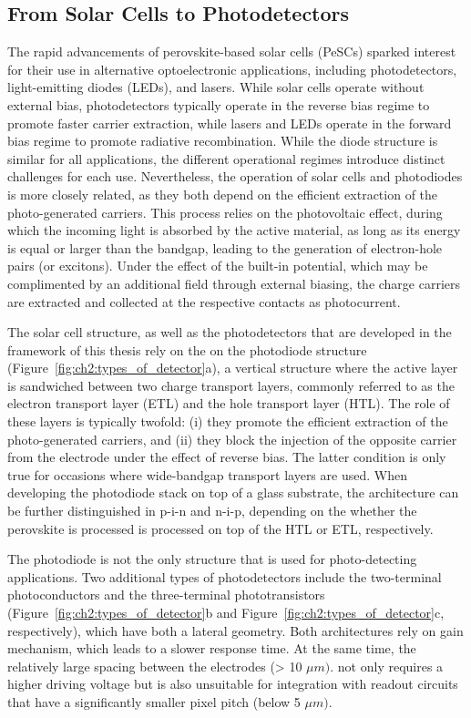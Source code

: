 \subsection{From Solar Cells to Photodetectors}

The rapid advancements of perovskite-based solar cells (PeSCs) sparked interest for their use in alternative optoelectronic applications, including photodetectors, light-emitting diodes (LEDs), and lasers. While solar cells operate without external bias, photodetectors typically operate in the reverse bias regime to promote faster carrier extraction, while lasers and LEDs operate in the forward bias regime to promote radiative recombination. While the diode structure is similar for all applications, the different operational regimes introduce distinct challenges for each use. Nevertheless, the operation of solar cells and photodiodes is more closely related, as they both depend on the efficient extraction of the photo-generated carriers. This process relies on the photovoltaic effect, during which the incoming light is absorbed by the active material, as long as its energy is equal or larger than the bandgap, leading to the generation of electron-hole pairs (or excitons). Under the effect of the built-in potential, which may be complimented by an additional field through external biasing, the charge carriers are extracted and collected at the respective contacts as photocurrent. 

The solar cell structure, as well as the photodetectors that are developed in the framework of this thesis rely on the on the photodiode structure (Figure~\ref{fig:ch2:types_of_detector}a), a vertical structure where the active layer is sandwiched between two charge transport layers, commonly referred to as the electron transport layer (ETL) and the hole transport layer (HTL). The role of these layers is typically twofold: (i) they promote the efficient extraction of the photo-generated carriers, and (ii) they block the injection of the opposite carrier from the electrode under the effect of reverse bias. The latter condition is only true for occasions where wide-bandgap transport layers are used. When developing the photodiode stack on top of a glass substrate, the architecture can be further distinguished in p-i-n and n-i-p, depending on the whether the perovskite is processed is processed on top of the HTL or ETL, respectively. 

The photodiode is not the only structure that is used for photo-detecting applications. Two additional types of photodetectors include the two-terminal photoconductors and the three-terminal phototransistors (Figure~\ref{fig:ch2:types_of_detector}b and Figure~\ref{fig:ch2:types_of_detector}c, respectively), which have both a lateral geometry. Both architectures rely on gain mechanism, which leads to a slower response time. At the same time, the relatively large spacing between the electrodes (> 10 $\mu m)$. not only requires a higher driving voltage but is also unsuitable for integration with readout circuits that have a significantly smaller pixel pitch (below 5 $\mu m)$.

